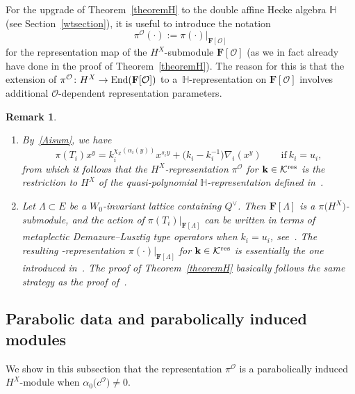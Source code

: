 \documentclass[11pt]{article}
\numberwithin{equation}{section}
\numberwithin{equation}{section}
\newtheorem{Remark}[Theorem]{Remark} }
\begin{document}
 For the upgrade of Theorem~\ref{theoremH} to the double affine Hecke algebra $\mathbb{H}$ (see Section~\ref{wtsection}), it is useful to introduce the notation
 \begin{equation*}%
 \pi^\mathcal{O}(\cdot):=\pi(\cdot)\vert_{\mathbf{F}[\mathcal{O}]}
 \end{equation*}
 for the representation map of the $H^X$-submodule $\mathbf{F}[\mathcal{O}]$ (as we in fact already have done in the proof of Theorem~\ref{theoremH}). The reason for this is that the extension of $\pi^{\mathcal{O}}\colon H^X\rightarrow\textup{End}(\mathbf{F}[\mathcal{O}])$ to a~$\mathbb{H}$-representation on $\mathbf{F}[\mathcal{O}]$ involves additional $\mathcal{O}$-dependent representation parameters.

\begin{Remark}\quad
\begin{enumerate}\itemsep=0pt
\item
By~\eqref{Aisum}, we have
\begin{equation*}%
\pi(T_i)x^y=k_i^{\chi_{\mathbb{Z}}(\alpha_i(y))}x^{s_iy}+\bigl(k_i-k_i^{-1}\bigr)\nabla_i(x^y)\qquad
\text{if}\ k_i=u_i,
\end{equation*}
from which it follows that the $H^X$-representation $\pi^\mathcal{O}$ for $\mathbf{k}\in\mathcal{K}^{{\rm res}}$ is the restriction to $H^X$ of the quasi-polynomial $\mathbb{H}$-representation defined in~\cite[Theorem~1.1] {SSV2}.
\item Let $\Lambda\subset E$ be a $W_0$-invariant lattice containing $Q^\vee$. Then $\mathbf{F}[\Lambda]$ is a $\pi\bigl(H^X\bigr)$-submodule, and the action of $\pi(T_i)\vert_{\mathbf{F}[\Lambda]}$ can be written in terms of metaplectic Demazure--Lusztig type operators when $k_i=u_i$, see~\cite{SSV2}.
The resulting -representation $\pi(\cdot)\vert_{\mathbf{F}[\Lambda]}$ for $\mathbf{k}\in\mathcal{K}^{{\rm res}}$ is essentially the one introduced in~\cite[Theorem~3.7]{SSV1}. The proof of
 Theorem~\ref{theoremH} basically follows the same strategy as the proof of~\cite[Theorem~3.7]{SSV1}.
 \end{enumerate}
 \end{Remark}
\subsection{Parabolic data and parabolically induced modules}\label{section_pi_mod}
We show in this subsection that the representation $\pi^\mathcal{O}$ is a parabolically induced $H^X$-module when $\alpha_0\bigl(c^\mathcal{O}\bigr)\not=0$.
\end{document}
